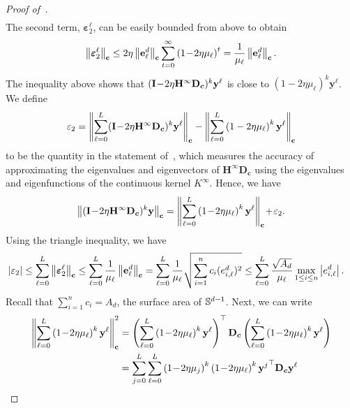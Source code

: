 \begin{proof}[Proof of~]
\begin{align*}
\end{align*}
The second term, $\boldsymbol{\varepsilon}_2^\ell$, can be easily bounded from above to obtain
\begin{equation*}
    \left\lVert\boldsymbol{\varepsilon}_2^\ell\right\rVert_{\mathbf{c}} \leq 2\eta \left\lVert\mathbf{e}^d_\ell\right\rVert_{\mathbf{c}} \sum_{t = 0}^{\infty} \left(1\!-\!2\eta\mu_\ell\right)^t = \frac{1}{\mu_\ell} \left\lVert\mathbf{e}^d_\ell\right\rVert_{\mathbf{c}}.
\end{equation*}
The inequality above shows that $(\mathbf{I} \!-\! 2\eta {\mathbf{H}}^\infty\mathbf{D}_{\boldsymbol{c}})^k\mathbf{y}^\ell$ is close to $\left(1-2\eta\mu_\ell\right)^k \mathbf{y}^\ell$. We define \begin{equation*}
    \varepsilon_2 = \left\lVert\sum_{\ell=0}^L (\mathbf{I} \!-\! 2\eta {\mathbf{H}}^\infty\mathbf{D}_{\boldsymbol{c}})^k\mathbf{y}^\ell\right\rVert_{\mathbf{c}} - \left\lVert\sum_{\ell=0}^L \left(1-2\eta\mu_\ell\right)^k \mathbf{y}^\ell\right\rVert_{\mathbf{c}}
\end{equation*}
to be the quantity in the statement of~, which measures the accuracy of approximating the eigenvalues and eigenvectors of $\mathbf{H}^\infty \mathbf{D_c}$ using the eigenvalues and eigenfunctions of the continuous kernel $K^\infty$. Hence, we have
\begin{equation}\label{eq.L2eps2}
    \left\lVert(\mathbf{I} \!-\! 2\eta {\mathbf{H}}^\infty\mathbf{D}_{\boldsymbol{c}})^k\mathbf{y}\right\rVert_{\mathbf{c}} = \left\lVert\sum_{\ell=0}^L \left(1\!-\!2\eta\mu_\ell\right)^k\mathbf{y}^\ell\right\rVert_{\mathbf{c}} \!+\! \varepsilon_2.
\end{equation}
Using the triangle inequality, we have
\begin{align*}
    \left|\varepsilon_2\right| & \leq\sum_{\ell=0}^L \left\lVert\boldsymbol{\varepsilon}_2^\ell\right\rVert_{\mathbf{c}} \leq \sum_{\ell=0}^L \frac{1}{\mu_\ell} \left\lVert\mathbf{e}^d_\ell\right\rVert_{\mathbf{c}} = \sum_{\ell=0}^L \frac{1}{\mu_\ell} \sqrt{\sum_{i=1}^n c_i (e_{i,\ell}^d)^2} \leq \sum_{\ell=0}^L \frac{\sqrt{A_d}}{\mu_\ell} \max_{1 \leq i \leq n} \left|e^d_{i,\ell}\right|.
\end{align*}
Recall that $\sum_{i=1}^n c_i = A_d$, the surface area of ${\mathbb{S}}^{d-1}$. Next, we can write
\begin{align}
   \normc{\sum_{\ell=0}^L \left(1\!-\!2\eta\mu_\ell\right)^k\mathbf{y}^\ell}^2 &= \left(\sum_{\ell=0}^L \left(1\!-\!2\eta\mu_\ell\right)^k\mathbf{y}^\ell\right)^\top \Dc \left(\sum_{\ell=0}^L \left(1\!-\!2\eta\mu_\ell\right)^k\mathbf{y}^\ell\right) \nonumber \\
    &= \sum_{j=0}^L \sum_{\ell=0}^L  \left(1\!-\!2\eta\mu_j\right)^k \left(1\!-\!2\eta\mu_\ell\right)^k {\mathbf{y}^j}^\top \Dc \mathbf{y}^\ell \nonumber \\

\end{align}
\end{proof}
